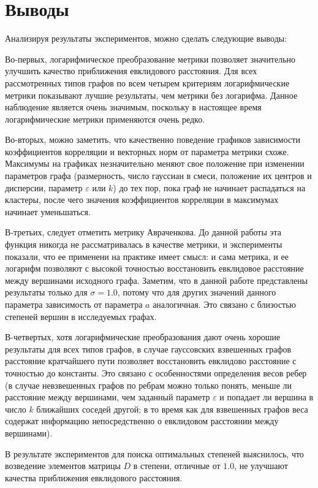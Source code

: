 \chapter*{Выводы}						%

Анализируя результаты экспериментов, можно сделать следующие выводы:

Во-первых, логарифмическое преобразование метрики позволяет значительно улучшить качество приближения евклидового расстояния. Для всех рассмотренных типов графов по всем четырем критериям логарифмические метрики показывают лучшие результаты, чем метрики без логарифма. Данное наблюдение является очень значимым, поскольку в настоящее время логарифмические метрики применяются очень редко.

Во-вторых, можно заметить, что качественно поведение графиков зависимости коэффициентов корреляции и векторных норм от параметра метрики схоже. Максимумы на графиках незначительно меняют свое положение при изменении параметров графа (размерность, число гауссиан в смеси, положение их центров и дисперсии, параметр $\varepsilon$ или $k$) до тех пор, пока граф не начинает распадаться на кластеры, после чего значения коэффициентов корреляции в максимумах начинает уменьшаться.

В-третьих, следует отметить метрику Авраченкова. До данной работы эта функция никогда не рассматривалась в качестве метрики, и эксперименты показали, что ее применени на практике имеет смысл: и сама метрика, и ее логарифм позволяют с высокой точностью восстановить евклидовое расстояние между вершинами исходного графа. Заметим, что в данной работе представлены результаты только для $\sigma=1.0$, потому что для других значений данного параметра зависимость от  параметра $a$ аналогичная. Это связано с близостью степеней вершин в исследуемых графах.


В-четвертых, хотя логарифмические преобразования дают очень хорошие результаты для всех типов графов, в случае гауссовских взвешенных графов расстояние кратчайшего пути позволяет восстановить евклидово расстояние с точностью до константы. Это связано с особенностями определения весов ребер (в случае невзвешенных графов по ребрам можно только понять, меньше ли расстояние между вершинами, чем заданный параметр $\varepsilon$ и попадает ли вершина в число $k$ ближайших соседей другой; в то время как для взвешенных графов веса содержат информацию непосредственно о евклидовом расстоянии между вершинами).


В результате экспериментов для поиска оптимальных степеней выяснилось, что возведение элементов матрицы $D$ в степени, отличные от $1.0$, не улучшают качества приближения евклидового расстояния.
